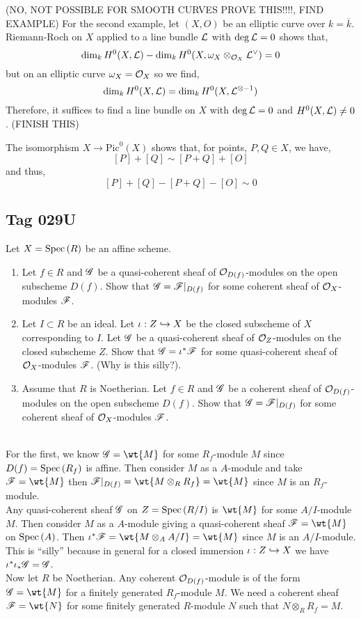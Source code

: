 \documentclass[12pt]{article}
\begin{document}
(NO, NOT POSSIBLE FOR SMOOTH CURVES PROVE THIS!!!!, FIND EXAMPLE)
For the second example, let $(X, O)$ be an elliptic curve over $k = \overline{k}$. Riemann-Roch on $X$ applied to a line bundle $\mathcal{L}$ with $\deg{\mathcal{L}} = 0$ shows that,
\[ \dim_k H^0(X, \mathcal{L}) - \dim_k H^0(X, \omega_X \otimes_{\mathcal{O}_{X}} \mathcal{L}^\vee) = 0 \]
but on an elliptic curve $\omega_X = \mathcal{O}_{X}$ so we find,
\[ \dim_k H^0(X, \mathcal{L}) = \dim_k H^0(X, \mathcal{L}^{\otimes -1}) \]
Therefore, it suffices to find a line bundle on $X$ with $\deg{\mathcal{L}} = 0$ and $H^0(X, \mathcal{L}) \neq 0$. 
(FINISH THIS)




The isomorphism $X \to \mathrm{Pic}^0(X)$ shows that, for points, $P,Q \in X$, we have,
\[ [P] + [Q] \sim [P + Q] + [O] \]
and thus,
\[ [P] + [Q] - [P + Q] - [O] \sim 0 \]

\subsection{Tag 029U}

\begin{exr}
Let $X = \mathrm{Spec}\left( R \right)$ be an affine scheme.
\begin{enumerate}
\item Let $f \in R$ and $\mathscr{G}$ be a quasi-coherent sheaf of $\mathcal{O}_{D(f)}$-modules on the open subscheme $D(f)$. Show that $\mathscr{G} = \mathscr{F} |_{D(f)}$ for some coherent sheaf of $\mathcal{O}_{X}$-modules $\mathscr{F}$.
\item Let $I \subset R$ be an ideal. Let $\iota : Z \hookrightarrow X$ be the closed subscheme of $X$ corresponding to $I$. Let $\mathscr{G}$ be a quasi-coherent sheaf of $\mathcal{O}_{Z}$-modules on the closed subscheme $Z$. Show that $\mathscr{G} = \iota^* \mathscr{F}$ for some quasi-coherent sheaf of $\mathcal{O}_{X}$-modules $\mathscr{F}$. (Why is this silly?).
\item Assume that $R$ is Noetherian. Let $f \in R$ and $\mathscr{G}$ be a coherent sheaf of $\mathcal{O}_{D(f)}$-modules on the open subscheme $D(f)$. Show that $\mathscr{G} = \mathscr{F} |_{D(f)}$ for some coherent sheaf of $\mathcal{O}_{X}$-modules $\mathscr{F}$.
\end{enumerate}
\end{exr}
\noindent\\
For the first, we know $\G = \wt{M}$ for some $R_f$-module $M$ since $D(f) = \mathrm{Spec}\left( R_f \right)$ is affine. Then consider $M$ as a $A$-module and take $\F = \wt{M}$ then $\F |_{D(f)} = \wt{M \otimes_R R_f} = \wt{M}$ since $M$ is an $R_f$-module.
\bigskip\\
Any quasi-coherent sheaf $\mathscr{G}$ on $Z = \mathrm{Spec}\left( R/I \right)$ is $\wt{M}$ for some $A/I$-module $M$. Then consider $M$ as a $A$-module giving a quasi-coherent sheaf $\F = \wt{M}$ on $\mathrm{Spec}\left( A \right)$. Then $\iota^* \F = \wt{M \otimes_A A/I} = \wt{M}$ since $M$ is an $A/I$-module. This is ``silly'' because in general for a closed immersion $\iota : Z \hookrightarrow X$ we have $\iota^* \iota_* \mathscr{G} = \mathscr{G}$. 
\bigskip\\
Now let $R$ be Noetherian. Any coherent $\mathcal{O}_{D(f)}$-module is of the form $\G = \wt{M}$ for a finitely generated $R_f$-module $M$. We need a coherent sheaf $\F = \wt{N}$ for some finitely generated $R$-module $N$ such that $N \otimes_R R_f = M$.  
\end{document}
